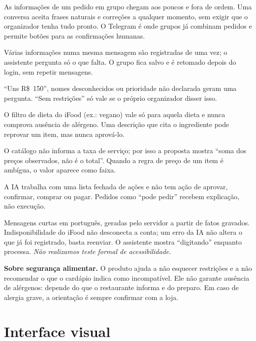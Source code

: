 \documentclass[11pt,a4paper]{article}
\begin{document}
\begin{description}[style=nextline,leftmargin=0.5cm]
  \item[Por que conversa, e por que no Telegram] As informações de um pedido em grupo chegam aos poucos e fora de ordem. Uma conversa aceita frases naturais e correções a qualquer momento, sem exigir que o organizador tenha tudo pronto. O Telegram é onde grupos já combinam pedidos e permite botões para as confirmações humanas.
  \item[Menos coisa para lembrar] Várias informações numa mesma mensagem são registradas de uma vez; o assistente pergunta só o que falta. O grupo fica salvo e é retomado depois do login, sem repetir mensagens.
  \item[Ambiguidade vira pergunta] ``Uns R\$~150'', nomes desconhecidos ou prioridade não declarada geram uma pergunta. ``Sem restrições'' só vale se o próprio organizador disser isso.
  \item[Restrições por pessoa] O filtro de dieta do iFood (ex.: vegano) vale só para aquela dieta e nunca comprova ausência de alérgeno. Uma descrição que cita o ingrediente pode reprovar um item, mas nunca aprová-lo.
  \item[Transparência financeira] O catálogo não informa a taxa de serviço; por isso a proposta mostra ``soma dos preços observados, não é o total''. Quando a regra de preço de um item é ambígua, o valor aparece como faixa.
  \item[Controle humano] A IA trabalha com uma lista fechada de ações e não tem ação de aprovar, confirmar, comprar ou pagar. Pedidos como ``pode pedir'' recebem explicação, não execução.
  \item[Clareza e erros] Mensagens curtas em português, geradas pelo servidor a partir de fatos gravados. Indisponibilidade do iFood não desconecta a conta; um erro da IA não altera o que já foi registrado, basta reenviar. O assistente mostra ``digitando'' enquanto processa. \emph{Não realizamos teste formal de acessibilidade.}
\end{description}

\textbf{Sobre segurança alimentar.} O produto ajuda a não esquecer restrições e a não recomendar o que o cardápio indica como incompatível. Ele não garante ausência de alérgenos: depende do que o restaurante informa e do preparo. Em caso de alergia grave, a orientação é sempre confirmar com a loja.

\section{Interface visual}\label{sec:interface}
\end{document}
